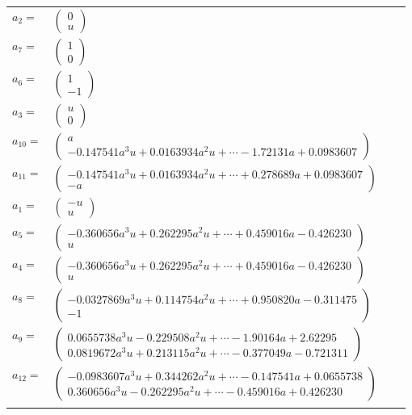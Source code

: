 \documentclass[1p]{elsarticle_modified}
\theoremstyle{definition}
\begin{document}
\begin{tabular}{m{7pt} m{180pt} m{7pt} m{180pt} }
\flushright $a_{2}=$&$\begin{pmatrix}0\\u\end{pmatrix}$ \\
\flushright $a_{7}=$&$\begin{pmatrix}1\\0\end{pmatrix}$ \\
\flushright $a_{6}=$&$\begin{pmatrix}1\\-1\end{pmatrix}$ \\
\flushright $a_{3}=$&$\begin{pmatrix}u\\0\end{pmatrix}$ \\
\flushright $a_{10}=$&$\begin{pmatrix}a\\-0.147541 a^{3} u+0.0163934 a^{2} u+\cdots-1.72131 a+0.0983607\end{pmatrix}$ \\
\flushright $a_{11}=$&$\begin{pmatrix}-0.147541 a^{3} u+0.0163934 a^{2} u+\cdots+0.278689 a+0.0983607\\- a\end{pmatrix}$ \\
\flushright $a_{1}=$&$\begin{pmatrix}- u\\u\end{pmatrix}$ \\
\flushright $a_{5}=$&$\begin{pmatrix}-0.360656 a^{3} u+0.262295 a^{2} u+\cdots+0.459016 a-0.426230\\u\end{pmatrix}$ \\
\flushright $a_{4}=$&$\begin{pmatrix}-0.360656 a^{3} u+0.262295 a^{2} u+\cdots+0.459016 a-0.426230\\u\end{pmatrix}$ \\
\flushright $a_{8}=$&$\begin{pmatrix}-0.0327869 a^{3} u+0.114754 a^{2} u+\cdots+0.950820 a-0.311475\\-1\end{pmatrix}$ \\
\flushright $a_{9}=$&$\begin{pmatrix}0.0655738 a^{3} u-0.229508 a^{2} u+\cdots-1.90164 a+2.62295\\0.0819672 a^{3} u+0.213115 a^{2} u+\cdots-0.377049 a-0.721311\end{pmatrix}$ \\
\flushright $a_{12}=$&$\begin{pmatrix}-0.0983607 a^{3} u+0.344262 a^{2} u+\cdots-0.147541 a+0.0655738\\0.360656 a^{3} u-0.262295 a^{2} u+\cdots-0.459016 a+0.426230\end{pmatrix}$\\&\end{tabular}
\end{document}
